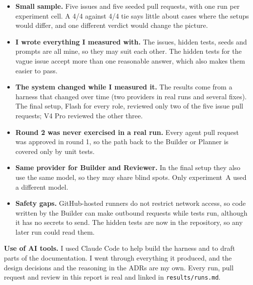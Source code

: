 \documentclass[10pt,a4paper]{article}
\newcommand{\code}[1]{\texttt{#1}}
\begin{document}
\begin{itemize}
\item \textbf{Small sample.} Five issues and five seeded pull requests, with one run per experiment cell.
A 4/4 against 4/4 tie says little about cases where the setups would differ, and one different verdict
would change the picture.
\item \textbf{I wrote everything I measured with.} The issues, hidden tests, seeds and prompts are all
mine, so they may suit each other. The hidden tests for the vague issue accept more
than one reasonable answer, which also makes them easier to pass.
\item \textbf{The system changed while I measured it.} The results come from a harness that changed over
time (two providers in real runs and several fixes). The final setup, Flash for every role, reviewed
only two of the five issue pull requests; V4 Pro reviewed the other three.
\item \textbf{Round 2 was never exercised in a real run.} Every agent pull request was approved in round
1, so the path back to the Builder or Planner is covered only by unit tests.
\item \textbf{Same provider for Builder and Reviewer.} In the final setup they also use the same model, so
they may share blind spots. Only experiment~A used a different model.
\item \textbf{Safety gaps.} GitHub-hosted runners do not restrict network access, so code written by the
Builder can make outbound requests while tests run, although it has no secrets to send. The hidden tests
are now in the repository, so any later run could read them.
\end{itemize}

\vspace{2pt}
{\small\textbf{Use of AI tools.} I used Claude Code to help build the harness and to draft parts of the
documentation. I went through everything it produced, and the design decisions and the reasoning in
the ADRs are my own. Every run, pull request and review in this report is real and linked in
\code{results/runs.md}.}
\end{document}
